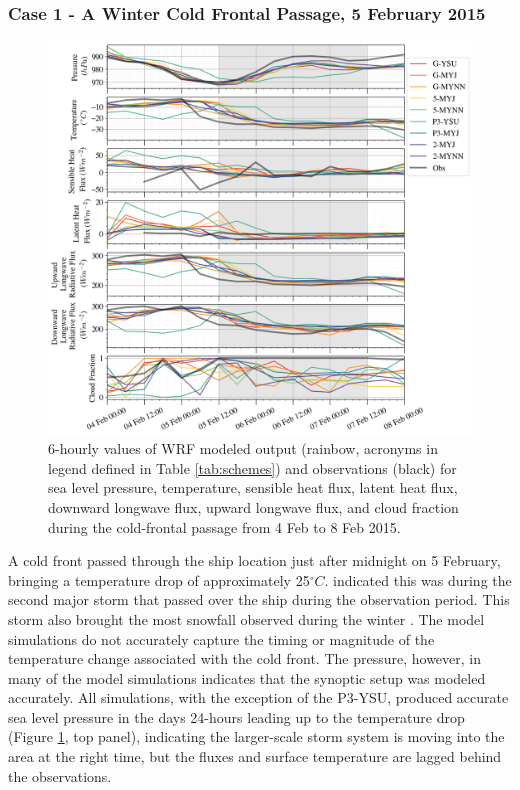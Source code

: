 \subsubsection{Case 1 - A Winter Cold Frontal Passage, 5 February 2015}
\begin{figure}[p]
    \centering \hspace*{-0.75cm}
    \includegraphics[width=1.1\linewidth]{figures/chapter3/wrf_case1.png}
    \caption[Polar WRF Case 1 - Winter cold front (5 Feb 2015) time series]{6-hourly values of WRF modeled output (rainbow, acronyms in legend defined in Table \ref{tab:schemes}) and observations (black) for sea level pressure, temperature, sensible heat flux, latent heat flux, downward longwave flux, upward longwave flux, and cloud fraction during the cold-frontal passage from 4 Feb to 8 Feb 2015.}
    \label{fig:wrf_case1}
\end{figure}

A cold front passed through the ship location just after midnight on 5 February, bringing a temperature drop of approximately 25$^{\circ}C$. \citet{cohen:2017} indicated this was during the second major storm that passed over the ship during the observation period. This storm also brought the most snowfall observed during the winter \citep{cohen:2017}. The model simulations do not accurately capture the timing or magnitude of the temperature change associated with the cold front. The pressure, however, in many of the model simulations indicates that the synoptic setup was modeled accurately. All simulations, with the exception of the P3-YSU, produced accurate sea level pressure in the days 24-hours leading up to the temperature drop (Figure \ref{fig:wrf_case1}, top panel), indicating the larger-scale storm system is moving into the area at the right time, but the fluxes and surface temperature are lagged behind the observations.

